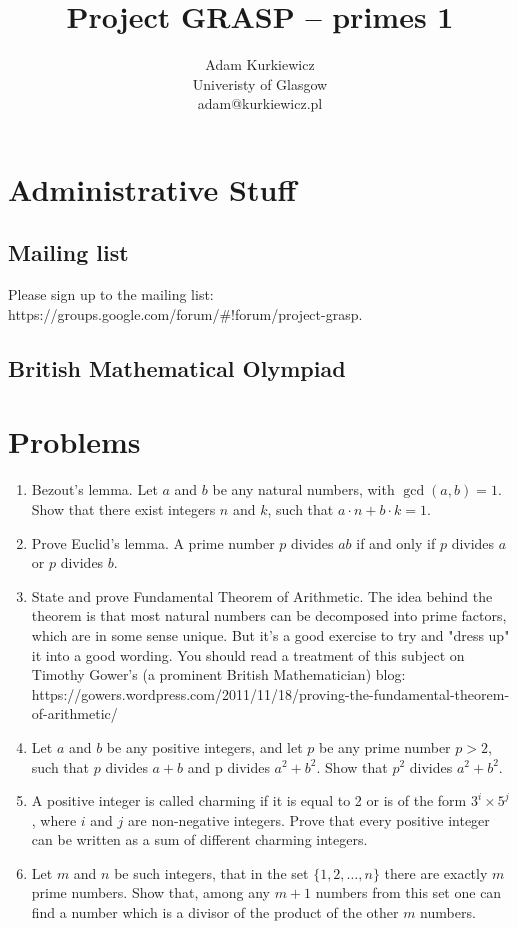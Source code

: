 \documentclass{article}
\title{Project GRASP -- primes 1}
\author{Adam Kurkiewicz\\
  \small{Univeristy of Glasgow}\\
  \small{adam@kurkiewicz.pl}}
\begin{document}
  \maketitle
  \section{Administrative Stuff}
  
  \subsection{Mailing list}
  Please sign up to the mailing list: https://groups.google.com/forum/\#!forum/project-grasp.
  \subsection{British Mathematical Olympiad}

  \section{Problems}
  
  \begin{enumerate}
    \item Bezout's lemma. Let $a$ and $b$ be any natural numbers, with $\gcd(a, b) = 1$. Show that there exist integers $n$ and $k$, such that $a\cdot n + b\cdot k = 1$.
    \item Prove Euclid's lemma. A prime number $p$ divides $ab$ if and only if $p$ divides $a$ or $p$ divides $b$.
    \item State and prove Fundamental Theorem of Arithmetic. The idea behind the theorem is that most natural numbers can be decomposed into prime factors, which are in some sense unique. But it's a good exercise to try and "dress up" it into a good wording. You should read a treatment of this subject on Timothy Gower's (a prominent British Mathematician) blog: https://gowers.wordpress.com/2011/11/18/proving-the-fundamental-theorem-of-arithmetic/
    \item Let $a$ and $b$ be any positive integers, and let $p$ be any prime number $p > 2$, such that $p$ divides $a + b$ and p divides $a^{2} + b^{2}$. Show that $p^{2}$ divides $a^{2} + b^{2}$.
    \item A positive integer is called charming if it is equal to 2 or is of the form $3^{i}×5^{j}$, where $i$ and $j$ are non-negative integers. Prove that every positive integer can be written as a sum of different charming integers.
    \item Let $m$ and $n$ be such integers, that in the set $\{1, 2, \ldots, n\}$ there are exactly $m$ prime numbers. Show that, among any $m + 1$ numbers from this set one can find a number which is a divisor of the product of the other $m$ numbers.
  \end{enumerate}
\end{document}
